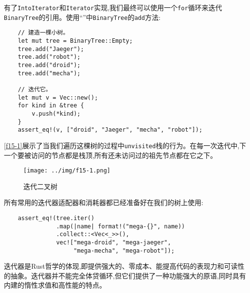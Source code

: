 有了\texttt{IntoIterator}和\texttt{Iterator}实现,我们最终可以使用一个\texttt{for}循环来迭代\texttt{BinaryTree}的引用。使用“”中\texttt{BinaryTree}的\texttt{add}方法:
\begin{verbatim}
    // 建造一棵小树。
    let mut tree = BinaryTree::Empty;
    tree.add("Jaeger");
    tree.add("robot");
    tree.add("droid");
    tree.add("mecha");

    // 迭代它。
    let mut v = Vec::new();
    for kind in &tree {
        v.push(*kind);
    }
    assert_eq!(v, ["droid", "Jaeger", "mecha", "robot"]);
\end{verbatim}

\autoref{f15-1}展示了当我们遍历这棵树的过程中\texttt{unvisited}栈的行为。在每一次迭代中,下一个要被访问的节点都是栈顶,所有还未访问过的祖先节点都在它之下。

\begin{figure}[htbp]
    \centering
    \texttt{[image: ../img/f15-1.png]}
    \caption{迭代二叉树}
    \label{f15-1}
\end{figure}

所有常用的迭代器适配器和消耗器都已经准备好在我们的树上使用:
\begin{verbatim}
    assert_eq!(tree.iter()
               .map(|name| format!("mega-{}", name))
               .collect::<Vec<_>>(),
               vec!["mega-droid", "mega-jaeger",
                    "mega-mecha", "mega-robot"]);
\end{verbatim}

迭代器是Rust哲学的体现,即提供强大的、零成本、能提高代码的表现力和可读性的抽象。迭代器并不能完全体贷循环,但它们提供了一种功能强大的原语,同时具有内建的惰性求值和高性能的特点。
